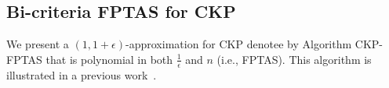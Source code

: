 
\subsection{Bi-criteria FPTAS for \textsc{CKP}} 
 


 

We present a  $(1,1+\epsilon)$-approximation  for \textsc{CKP} denotee by Algorithm {\sc CKP-FPTAS} that is polynomial in both $\frac{1}{\epsilon}$ and $n$ (i.e., FPTAS). This algorithm is illustrated in a previous work~\cite{CEK14CKP}.



